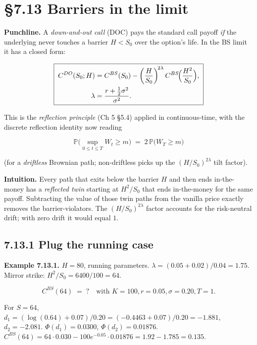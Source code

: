 \documentclass[
  10pt,
  twoside]{book}
\begin{document}
\section{§7.13 Barriers in the limit}\label{barriers-in-the-limit}

\textbf{Punchline.} A \emph{down-and-out call} (DOC) pays the standard
call payoff \emph{if} the underlying never touches a barrier \(H < S_0\)
over the option's life. In the BS limit it has a closed form:

\[\boxed{\;\begin{aligned}
C^{DO}(S_0; H) &= C^{BS}(S_0) - \biggl(\frac{H}{S_0}\biggr)^{\!2\lambda}\,C^{BS}\!\Bigl(\frac{H^2}{S_0}\Bigr), \\
\lambda &= \frac{r + \tfrac{1}{2}\sigma^2}{\sigma^2}.
\end{aligned}\;}\]

This is the \emph{reflection principle} (Ch 5 §5.4) applied in
continuous-time, with the discrete reflection identity now reading

\[\mathbb P\bigl(\sup_{0 \le t \le T} W_t \ge m\bigr) \;=\; 2\,\mathbb P\bigl(W_T \ge m\bigr)\]

(for a \emph{driftless} Brownian path; non-driftless picks up the
\((H/S_0)^{2\lambda}\) tilt factor).

\textbf{Intuition.} Every path that exits below the barrier \(H\) and
then ends in-the-money has a \emph{reflected twin} starting at
\(H^2/S_0\) that ends in-the-money for the same payoff. Subtracting the
value of those twin paths from the vanilla price exactly removes the
barrier-violators. The \((H/S_0)^{2\lambda}\) factor accounts for the
risk-neutral drift; with zero drift it would equal \(1\).

\subsection{7.13.1 Plug the running case}\label{plug-the-running-case-2}

\textbf{Example 7.13.1.} \(H = 80\), running parameters.
\(\lambda = (0.05 + 0.02)/0.04 = 1.75\). Mirror strike:
\(H^2/S_0 = 6400/100 = 64\).

\[C^{BS}(64) \;=\; ? \quad \text{with } K = 100, r = 0.05, \sigma = 0.20, T = 1.\]

For \(S = 64\),
\(d_1 = (\log(0.64) + 0.07)/0.20 = (-0.4463 + 0.07)/0.20 = -1.881\),
\(d_2 = -2.081\). \(\Phi(d_1) = 0.0300\), \(\Phi(d_2) = 0.01876\).
\(C^{BS}(64) = 64 \cdot 0.030 - 100 e^{-0.05} \cdot 0.01876 = 1.92 - 1.785 = 0.135\).
\end{document}
